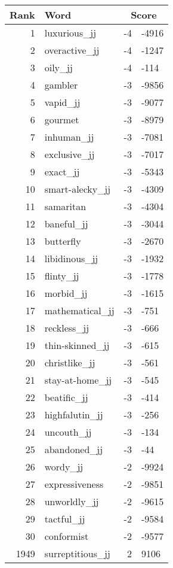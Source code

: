 \begin{longtable}[!htbp]{| rlr@{.}l |}
    \hline
    \textbf{Rank} & \textbf{Word} & \multicolumn{2}{c|}{\textbf{Score}} \\
    \hline
    \endhead
    1 & luxurious\_jj & -4 & -4916 \\
    2 & overactive\_jj & -4 & -1247 \\
    3 & oily\_jj & -4 & -114 \\
    4 & gambler & -3 & -9856 \\
    5 & vapid\_jj & -3 & -9077 \\
    6 & gourmet & -3 & -8979 \\
    7 & inhuman\_jj & -3 & -7081 \\
    8 & exclusive\_jj & -3 & -7017 \\
    9 & exact\_jj & -3 & -5343 \\
    10 & smart-alecky\_jj & -3 & -4309 \\
    11 & samaritan & -3 & -4304 \\
    12 & baneful\_jj & -3 & -3044 \\
    13 & butterfly & -3 & -2670 \\
    14 & libidinous\_jj & -3 & -1932 \\
    15 & flinty\_jj & -3 & -1778 \\
    16 & morbid\_jj & -3 & -1615 \\
    17 & mathematical\_jj & -3 & -751 \\
    18 & reckless\_jj & -3 & -666 \\
    19 & thin-skinned\_jj & -3 & -615 \\
    20 & christlike\_jj & -3 & -561 \\
    21 & stay-at-home\_jj & -3 & -545 \\
    22 & beatific\_jj & -3 & -414 \\
    23 & highfalutin\_jj & -3 & -256 \\
    24 & uncouth\_jj & -3 & -134 \\
    25 & abandoned\_jj & -3 & -44 \\
    26 & wordy\_jj & -2 & -9924 \\
    27 & expressiveness & -2 & -9851 \\
    28 & unworldly\_jj & -2 & -9615 \\
    29 & tactful\_jj & -2 & -9584 \\
    30 & conformist & -2 & -9577 \\
    1949 & surreptitious\_jj & 2 & 9106 \\

\end{longtable}

